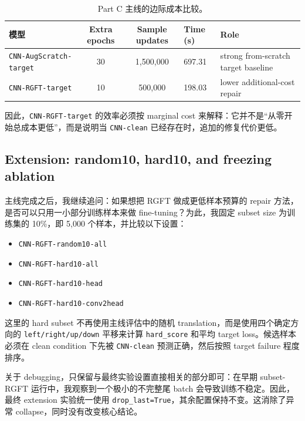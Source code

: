 \documentclass[12pt,a4paper,fontset=fandol]{ctexart}
\begin{document}
\begin{table}[H]
  \centering
  \scriptsize
  \caption{Part C 主线的边际成本比较。}
  \renewcommand{\arraystretch}{1.08}
  \setlength{\tabcolsep}{4pt}
  \begin{tabular}{lccp{1.6cm}p{4.5cm}}
    \toprule
    模型 & Extra epochs & Sample updates & Time (s) & Role \\
    \midrule
    \texttt{CNN-AugScratch-target} & 30 & 1{,}500{,}000 & 697.31 & strong from-scratch target baseline \\
    \texttt{CNN-RGFT-target} & 10 & 500{,}000 & 198.03 & lower additional-cost repair \\
    \bottomrule
  \end{tabular}
\end{table}

因此，\texttt{CNN-RGFT-target} 的效率必须按 marginal cost 来解释：它并不是“从零开始总成本更低”，而是说明当 \texttt{CNN-clean} 已经存在时，追加的修复代价更低。

\subsection{Extension: random10, hard10, and freezing ablation}

主线完成之后，我继续追问：如果想把 RGFT 做成更低样本预算的 repair 方法，是否可以只用一小部分训练样本来做 fine-tuning？为此，我固定 subset size 为训练集的 10\%，即 5{,}000 个样本，并比较以下设置：
\begin{itemize}
  \item \texttt{CNN-RGFT-random10-all}
  \item \texttt{CNN-RGFT-hard10-all}
  \item \texttt{CNN-RGFT-hard10-head}
  \item \texttt{CNN-RGFT-hard10-conv2head}
\end{itemize}

这里的 hard subset 不再使用主线评估中的随机 translation，而是使用四个确定方向的 \texttt{left/right/up/down} 平移来计算 \texttt{hard\_score} 和平均 target loss。候选样本必须在 clean condition 下先被 \texttt{CNN-clean} 预测正确，然后按照 target failure 程度排序。

关于 debugging，只保留与最终实验设置直接相关的部分即可：在早期 subset-RGFT 运行中，我观察到一个极小的不完整尾 batch 会导致训练不稳定。因此，最终 extension 实验统一使用 \texttt{drop\_last=True}，其余配置保持不变。这消除了异常 collapse，同时没有改变核心结论。
\end{document}
